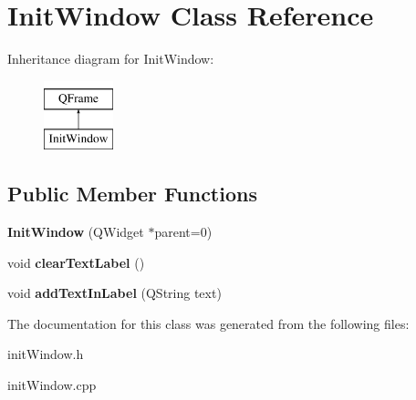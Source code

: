 \hypertarget{class_init_window}{}\section{Init\+Window Class Reference}
\label{class_init_window}
Inheritance diagram for Init\+Window\+:\begin{figure}[H]
\begin{center}
\leavevmode
\includegraphics[height=2.000000cm]{class_init_window}
\end{center}
\end{figure}
\subsection*{Public Member Functions}
\begin{DoxyCompactItemize}
\item 
\mbox{\label{class_init_window_af37dca6fb5d93b44043fae9b40e491c2}} 
{\bfseries Init\+Window} (Q\+Widget $\ast$parent=0)
\item 
\mbox{\label{class_init_window_af821b5ab5b2a17b87dc386a3a9fe4427}} 
void {\bfseries clear\+Text\+Label} ()
\item 
\mbox{\label{class_init_window_afc9bd5edd4cd8fbaca7bbe35e57acff3}} 
void {\bfseries add\+Text\+In\+Label} (Q\+String text)
\end{DoxyCompactItemize}


The documentation for this class was generated from the following files\+:\begin{DoxyCompactItemize}
\item 
init\+Window.\+h\item 
init\+Window.\+cpp\end{DoxyCompactItemize}
